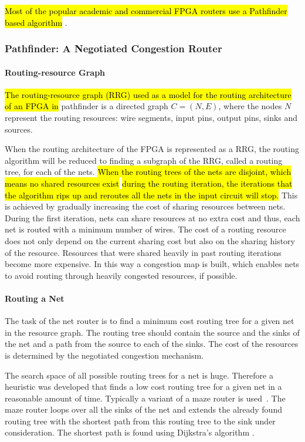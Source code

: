 \documentclass[a4paper,oneside,12pt]{article}
\begin{document}
\hl{Most of the popular academic and commercial FPGA routers use a Pathfinder based algorithm} \cite{vprboek,betz1997vanppartffr}.

\subsubsection{{\sc Pathfinder}: A Negotiated Congestion Router}
\label{sec:pathfinder}
\paragraph{Routing-resource Graph}
\hl{The routing-resource graph (RRG) used as a model for the routing architecture of an FPGA in} {\sc pathfinder} \cite{mcmurchie1995panprff} is a directed graph $C=(N,E)$, where the nodes $N$ represent the routing resources: wire segments, input pins, output pins, sinks and sources.

When the routing architecture of the FPGA is represented as a RRG, the routing algorithm will be reduced to finding a subgraph of the RRG, called a routing tree, for each of the nets. \hl{When the routing trees of the nets are disjoint, which means no shared resources exist} \cite{nair1987asyetfgw} \hl{during the routing iteration, the iterations that the algorithm rips up and reroutes all the nets in the input circuit will stop.}
This is achieved by gradually increasing the cost of sharing resources between nets. During the first iteration, nets can share resources at no extra cost and thus, each net is routed with a minimum number of wires. The cost of a routing resource does not only depend on the current sharing cost but also on the sharing history of the resource. Resources that were shared heavily in past routing iterations become more expensive. In this way a congestion map is built, which enables nets to avoid routing through heavily congested resources, if possible.

\paragraph{Routing a Net}
The task of the net router is to find a minimum cost routing tree for a given net in the resource graph. The routing tree should contain the source and the sinks of the net and a path from the source to each of the sinks. The cost of the resources is determined by the negotiated congestion mechanism.

The search space of all possible routing trees for a net is huge. Therefore a heuristic was developed that finds a low cost routing tree for a given net in a reasonable amount of time. Typically a variant of a maze router is used~\cite{lee1961aafpcaia}. The maze router loops over all the sinks of the net and extends the already found routing tree with the shortest path from this routing tree to the sink under consideration. The shortest path is found using Dijkstra's algorithm \cite{dijkstra1959anotpicwg}.
\end{document}
